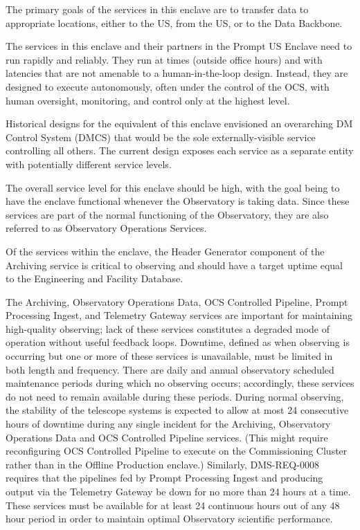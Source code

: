 \documentclass[DM,toc,lsstdraft]{lsstdoc}
\begin{document}
The primary goals of the services in this enclave are to transfer data
to appropriate locations, either to the US, from the US, or to the Data
Backbone.

The services in this enclave and their partners in the Prompt US Enclave
need to run rapidly and reliably. They run at times
(outside office hours) and with latencies that are not amenable to a
human-in-the-loop design. Instead, they are designed to execute
autonomously, often under the control of the OCS, with human oversight,
monitoring, and control only at the highest level.

Historical designs for the equivalent of this enclave envisioned an overarching DM Control System (DMCS) that would be the sole externally-visible service controlling all others.
The current design exposes each service as a separate entity with potentially different service levels.

The overall service level for this enclave should be high, with the goal being to have the enclave functional whenever the Observatory is taking data.
Since these services are part of the normal functioning of the Observatory, they are also referred to as Observatory Operations Services.

Of the services within the enclave, the Header Generator component of the Archiving service is critical to observing and should have a target uptime equal to the Engineering and Facility Database.

The Archiving, Observatory Operations Data, OCS Controlled Pipeline, Prompt Processing Ingest, and Telemetry Gateway services are important for maintaining high-quality observing; lack of these services constitutes a degraded mode of operation without useful feedback loops.
Downtime, defined as when observing is occurring but one or more of these services is unavailable, must be limited in both length and frequency.
There are daily and annual observatory scheduled maintenance periods during which no observing occurs; accordingly, these services do not need to remain available during these periods.
During normal observing, the stability of the telescope systems is expected to allow at most 24 consecutive hours of downtime during any single incident for the Archiving, Observatory Operations Data and OCS Controlled Pipeline services.
(This might require reconfiguring OCS Controlled Pipeline to execute on the Commissioning Cluster rather than in the Offline Production enclave.)
Similarly, DMS-REQ-0008 requires that the pipelines fed by Prompt Processing Ingest and producing output via the Telemetry Gateway be down for no more than 24 hours at a time.
These services must be available for at least 24 continuous hours out of any 48 hour period in order to maintain optimal Observatory scientific performance.
\end{document}
